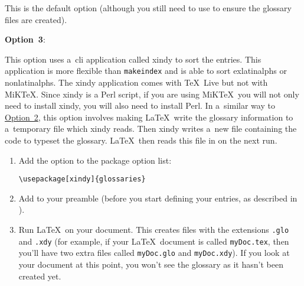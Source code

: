 \documentclass[report,inlinetitle]{nlctdoc}
\makeatletter
\newcommand*{\optionlabel}[1]{%
 \@glstarget{option#1}{}\textbf{Option~#1}}
\newcommand*{\opt}[1]{\hyperlink{option#1}{Option~#1}}
\makeatother
\begin{document}
\begin{description}
   This is the default option (although you still need to use
    to ensure the glossary files are created).

\item\optionlabel3:

   This option uses a~\gls{cli} application called
   \gls{xindy} to sort the entries. This application is more flexible than 
   \texttt{makeindex} and is able to sort \glspl{exlatinalph} or 
   \glspl{nonlatinalph}. The \gls{xindy} application comes with \TeX~Live 
   but not with MiK\TeX.  Since \gls{xindy} is a Perl script, if you are
   using MiK\TeX\ you will not only need to install \gls{xindy}, you
   will also need to install Perl. In a~similar way to \opt2, this 
   option involves making \LaTeX\ write the glossary information to 
   a~temporary file which \gls{xindy} reads. Then \gls{xindy} 
   writes a~new file containing the code to typeset the glossary. 
   \LaTeX\ then reads this file in on the next run.

   \begin{enumerate}
     \item Add the  option to the 
package option list:
\begin{verbatim}
\usepackage[xindy]{glossaries}
\end{verbatim}

     \item Add  to your preamble (before you start
     defining your entries, as described in ).

    \item Run \LaTeX\ on your document. This creates files with the
    extensions \texttt{.glo} and \texttt{.xdy} (for example, if your 
    \LaTeX\ document is called \texttt{myDoc.tex}, then you'll have 
    two extra files called \texttt{myDoc.glo} and \texttt{myDoc.xdy}).
    If you look at your document at this point, you won't see the 
    glossary as it hasn't been created yet.


\end{enumerate}
\end{description}
\end{document}

